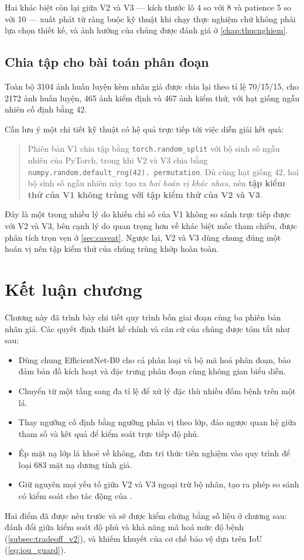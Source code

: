 Hai khác biệt còn lại giữa V2 và V3 --- kích thước lô 4 so với 8 và patience 5 so
với 10 --- xuất phát từ ràng buộc kỹ thuật khi chạy thực nghiệm chứ không phải lựa
chọn thiết kế, và ảnh hưởng của chúng được đánh giá ở \cref{chap:thucnghiem}.

\subsection{Chia tập cho bài toán phân đoạn}
\label{subsec:split_seg}

Toàn bộ \num{3104} ảnh huấn luyện kèm nhãn giả được chia lại theo tỉ lệ 70/15/15,
cho \num{2172} ảnh huấn luyện, 465 ảnh kiểm định và 467 ảnh kiểm thử, với hạt
giống ngẫu nhiên cố định bằng 42.

Cần lưu ý một chi tiết kỹ thuật có hệ quả trực tiếp tới việc diễn giải kết quả:

\begin{quote}
Phiên bản V1 chia tập bằng \texttt{torch.\allowbreak random\_\allowbreak split} với bộ sinh số ngẫu nhiên
của PyTorch, trong khi V2 và V3 chia bằng
\texttt{numpy.\allowbreak random.\allowbreak default\_rng(42).\allowbreak
permutation}. Dù cùng hạt giống 42, hai bộ
sinh số ngẫu nhiên này tạo ra \emph{hai hoán vị khác nhau}, nên \textbf{tập kiểm
thử của V1 không trùng với tập kiểm thử của V2 và V3}.
\end{quote}

Đây là một trong nhiều lý do khiến chỉ số của V1 không so sánh trực tiếp được với
V2 và V3, bên cạnh lý do quan trọng hơn về khác biệt mốc tham chiếu, được phân
tích trọn vẹn ở \cref{sec:caveat}. Ngược lại, V2 và V3 dùng chung đúng một hoán vị
nên tập kiểm thử của chúng trùng khớp hoàn toàn.

\section{Kết luận chương}

Chương này đã trình bày chi tiết quy trình bốn giai đoạn cùng ba phiên bản nhãn
giả. Các quyết định thiết kế chính và căn cứ của chúng được tóm tắt như sau:

\begin{itemize}
    \item Dùng chung EfficientNet-B0 cho cả phân loại và bộ mã hoá phân đoạn, bảo
          đảm bản đồ kích hoạt và đặc trưng phân đoạn cùng không gian biểu diễn.
    \item Chuyển từ \GradCAM{} một tầng sang \GradCAMpp{} đa tỉ lệ để xử lý đặc
          thù nhiều đốm bệnh trên một lá.
    \item Thay ngưỡng cố định bằng ngưỡng phân vị theo lớp, đảo ngược quan hệ giữa
          tham số và kết quả để kiểm soát trực tiếp độ phủ.
    \item Ép mặt nạ lớp lá khoẻ về không, đưa tri thức tiên nghiệm vào quy trình
          để loại \num{683} mặt nạ dương tính giả.
    \item Giữ nguyên mọi yếu tố giữa V2 và V3 ngoại trừ bộ nhãn, tạo ra phép so
          sánh có kiểm soát cho tác động của \SAM{}.
\end{itemize}

Hai điểm đã được nêu trước và sẽ được kiểm chứng bằng số liệu ở chương sau: đánh
đổi giữa kiểm soát độ phủ và khả năng mã hoá mức độ bệnh
(\cref{subsec:tradeoff_v2}), và khiếm khuyết của cơ chế bảo vệ dựa trên IoU
(\cref{eq:iou_guard}).
